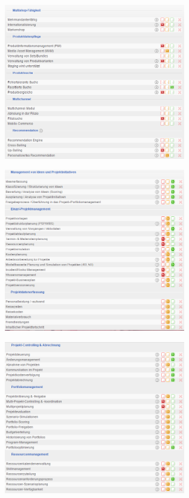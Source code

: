 \documentclass[12pt]{article}
\begin{document}
\noindent
\begin{figure}[here!]
\centering
\includegraphics[width=0.7\textwidth]{images/tr14}
\end{figure}\FloatBarrier
\noindent
\begin{figure}[here!]
\centering
\includegraphics[width=0.7\textwidth]{images/tr15}
\end{figure}\FloatBarrier
\noindent
\begin{figure}[here!]
\centering
\includegraphics[width=0.7\textwidth]{images/tr16}
\end{figure}\FloatBarrier
\end{document}
